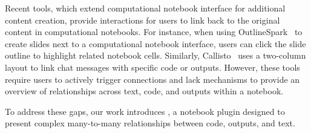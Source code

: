 {%
Recent tools, which extend computational notebook interface for additional content creation, provide interactions for users to link back to the original content in computational notebooks.
For instance, when using OutlineSpark~\cite{wang2024outlinespark} to create slides next to a computational notebook interface, users can click the slide outline to highlight related notebook cells.
Similarly, Callisto~\cite{shi2020calliope} uses a two-column layout to link chat messages with specific code or outputs.
However, these tools require users to actively trigger connections and lack mechanisms to provide an overview of relationships across text, code, and outputs within a notebook.

To address these gaps, our work introduces \tool, a notebook plugin designed to present complex many-to-many relationships between code, outputs, and text.
}


